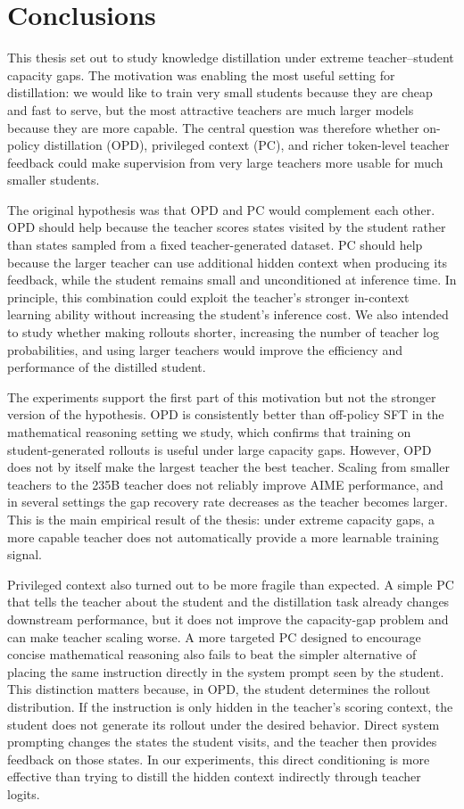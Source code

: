 \chapter{Conclusions}

This thesis set out to study knowledge distillation under extreme teacher--student capacity gaps. The motivation was enabling the most useful setting for distillation: we would like to train very small students because they are cheap and fast to serve, but the most attractive teachers are much larger models because they are more capable. The central question was therefore whether on-policy distillation (OPD), privileged context (PC), and richer token-level teacher feedback could make supervision from very large teachers more usable for much smaller students.

The original hypothesis was that OPD and PC would complement each other. OPD should help because the teacher scores states visited by the student rather than states sampled from a fixed teacher-generated dataset. PC should help because the larger teacher can use additional hidden context when producing its feedback, while the student remains small and unconditioned at inference time. In principle, this combination could exploit the teacher's stronger in-context learning ability without increasing the student's inference cost. We also intended to study whether making rollouts shorter, increasing the number of teacher log probabilities, and using larger teachers would improve the efficiency and performance of the distilled student.

The experiments support the first part of this motivation but not the stronger version of the hypothesis. OPD is consistently better than off-policy SFT in the mathematical reasoning setting we study, which confirms that training on student-generated rollouts is useful under large capacity gaps. However, OPD does not by itself make the largest teacher the best teacher. Scaling from smaller teachers to the 235B teacher does not reliably improve AIME performance, and in several settings the gap recovery rate decreases as the teacher becomes larger. This is the main empirical result of the thesis: under extreme capacity gaps, a more capable teacher does not automatically provide a more learnable training signal.

Privileged context also turned out to be more fragile than expected. A simple PC that tells the teacher about the student and the distillation task already changes downstream performance, but it does not improve the capacity-gap problem and can make teacher scaling worse. A more targeted PC designed to encourage concise mathematical reasoning also fails to beat the simpler alternative of placing the same instruction directly in the system prompt seen by the student. This distinction matters because, in OPD, the student determines the rollout distribution. If the instruction is only hidden in the teacher's scoring context, the student does not generate its rollout under the desired behavior. Direct system prompting changes the states the student visits, and the teacher then provides feedback on those states. In our experiments, this direct conditioning is more effective than trying to distill the hidden context indirectly through teacher logits.

